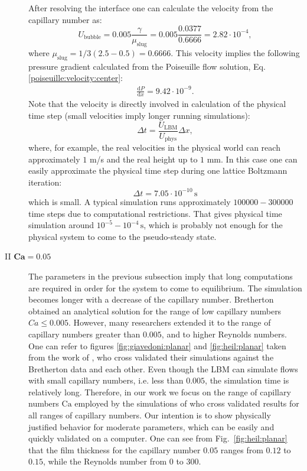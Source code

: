 \documentclass[preprint,12pt]{elsarticle}
\newcommand{\Ca}{\mathrm{Ca}}
\begin{document}
\begin{description}
After resolving the interface one can  calculate the
  velocity from the capillary number as:
  \begin{equation}
  U_{\mathrm{bubble}}=0.005 \frac{\gamma}{\mu_{\mathrm{slug}}}=0.005
\frac{0.0377}{0.6666}=2.82 \cdot10^{-4},
  \end{equation}
  where $\mu_{\mathrm{slug}}=1/3 (2.5-0.5)=0.6666$.
  This velocity implies the following pressure gradient calculated from the
  Poiseuille flow solution, Eq. \ref{poiseuille:velocity:center}: 
  \begin{equation}
  \begin{aligned}
  \frac{\mathrm{d}P}{\mathrm{d}x}=9.42 \cdot 10^{-9}.
  \end{aligned}
  \end{equation}
Note that the velocity is directly
involved in calculation of the physical time step (small velocities imply longer running
simulations):
\begin{equation}
\Delta t =\frac{U_{\mathrm{LBM}}}{U_{\mathrm{phys}}} \Delta x ,
\end{equation}
where, for example, the real velocities in the physical world can reach
approximately $1$ m/s and the real height up to $1$ mm. In this case one
can easily approximate the physical time step during one lattice Boltzmann iteration:
\begin{equation}
\Delta t = 7.05 \cdot 10^{-10} \,\mathrm{s}
\end{equation}
which is small. A typical simulation runs approximately
$100000-300000$ time steps due to computational restrictions. That gives 
physical time simulation around $10^{-5}-10^{-4}\,\mathrm{s}$, which is
probably not enough for the physical system to come to the pseudo-steady state.

 \item[II $\bm{Ca=0.05}$] 
   The parameters in the previous subsection imply that long
computations are required in order for the system to come to equilibrium. The simulation becomes longer with a decrease of the
capillary number. Bretherton obtained an analytical solution for the range of low capillary
numbers $Ca \leq 0.005$. However, many researchers extended it to the range of capillary numbers
greater than
$0.005$, and to higher Reynolds numbers. One can refer to figures
  \ref{fig:giavedoni:planar} and \ref{fig:heil:planar} taken from the work of
  \citet{giavedoni-numerical,heil-bretherton}, who cross validated their
  simulations against the Bretherton data and each other. Even though the LBM can simulate
flows with small capillary numbers, i.e. less than $0.005$, the simulation time
is relatively long. Therefore, in our work we focus on the range of capillary numbers $\Ca$
employed by the simulations of
\citet{giavedoni-numerical} who cross validated
results for all ranges of capillary numbers.  Our intention is
  to show physically justified behavior for moderate parameters,
which
  can be easily and quickly validated on a computer.
  One can see from Fig.~\ref{fig:heil:planar} that the film thickness for the
  capillary number $0.05$ ranges from $0.12$ to $0.15$, while the Reynolds
  number from $0$ to $300$.


\end{description}
\end{document}
